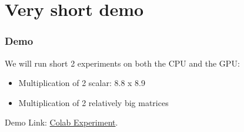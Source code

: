 \documentclass[11pt]{beamer}
\begin{document}
\section{Very short demo}
\begin{frame}[fragile]
	\frametitle{Demo}
	
	We will run short 2 experiments on both the CPU and the GPU:
	\begin{itemize}
		\item Multiplication of 2 scalar: 8.8 x 8.9
		\item Multiplication of 2 relatively big matrices
	\end{itemize}
	
		\centering
	Demo Link: 
\href{https://colab.research.google.com/drive/1q32stN5vWQ3XApmu58BczJJy62wTI3Zf#scrollTo=UjuLyp2wMK7D}{Colab Experiment}.
\end{frame}
\end{document}
